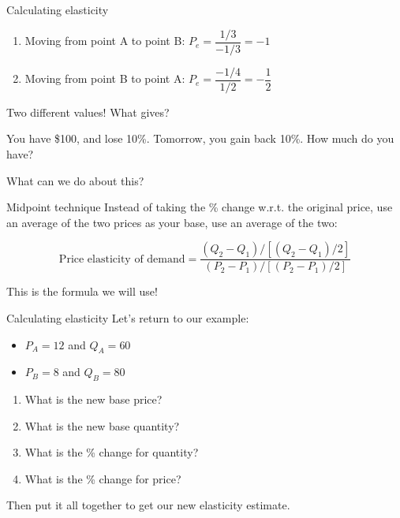 \documentclass[aspectratio=169]{beamer}
\begin{document}
\begin{frame}{Calculating elasticity}
    
    \begin{enumerate}
    \item Moving from point A to point B: $P_e = \dfrac{1/3}{-1/3} = -1$
    \item Moving from point B to point A: $P_e = \dfrac{-1/4}{1/2} = -\dfrac{1}{2}$
    \end{enumerate}

    Two different values! What gives?

    \medskip

    You have \$100, and lose 10\%. Tomorrow, you gain back 10\%. How much do you have?

    \medskip

    What can we do about this?

\end{frame}

\begin{frame}{Midpoint technique}
Instead of taking the \% change w.r.t. the original price, use an average of the two prices as your base,  use an average of the two:

$$
\text{Price elasticity of demand} = \dfrac{(Q_2 - Q_1)/[(Q_2 - Q_1)/2]}{(P_2 - P_1)/[(P_2 - P_1)/2]}
$$

This is the formula we will use!

\end{frame}

\begin{frame}{Calculating elasticity}
    Let's return to our example:
    \begin{itemize}
        \item $P_A=12$ and $Q_A=60$
        \item $P_B=8$ and $Q_B=80$
    \end{itemize}
    
    \medskip

    \begin{enumerate}
        \item What is the new base price?
        \item What is the new base quantity?
        \item What is the \% change for quantity?
        \item What is the \% change for price?
    \end{enumerate}

    Then put it all together to get our new elasticity estimate.
\end{frame}
\end{document}
